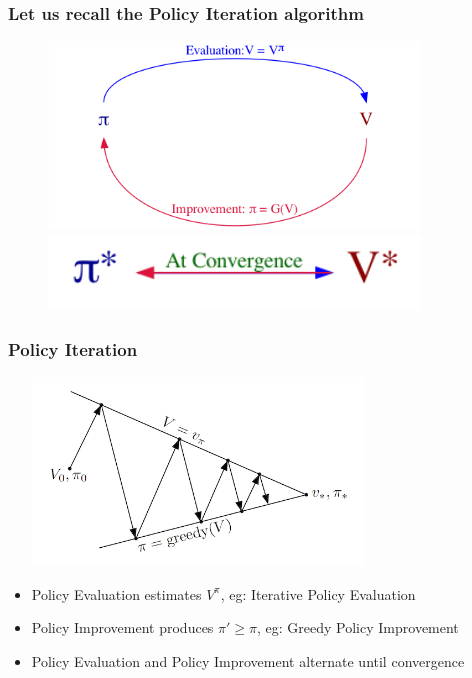 \documentclass[handout]{beamer}
\begin{document}
\begin{frame}
\frametitle{Let us recall the Policy Iteration algorithm}
\includegraphics[width=12cm, height=5cm]{policy_iteration_loop.png}
\includegraphics[width=12cm, height=2cm]{policy_iteration_convergence.png}
\end{frame}

\begin{frame}
\frametitle{Policy Iteration}
\includegraphics[width=10cm, height=5cm]{vf_policy_intersecting_lines.png}
\pause
\begin{itemize}[<+->]
\item Policy Evaluation estimates $V^{\pi}$, eg: Iterative Policy Evaluation
\item Policy Improvement produces $\pi' \geq \pi$, eg: Greedy Policy Improvement
\item Policy Evaluation and Policy Improvement alternate until convergence
\end{itemize}
\end{frame}
\end{document}
